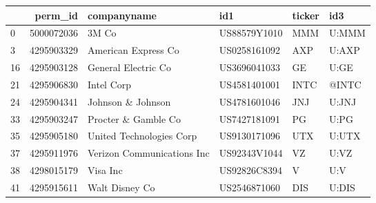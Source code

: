 \begin{tabular}{lrllll}
\toprule
{} &     perm\_id &                 companyname &           id1 & ticker &    id3 \\
\midrule
0  &  5000072036 &                       3M Co &  US88579Y1010 &    MMM &  U:MMM \\
3  &  4295903329 &         American Express Co &  US0258161092 &    AXP &  U:AXP \\
16 &  4295903128 &         General Electric Co &  US3696041033 &     GE &   U:GE \\
21 &  4295906830 &                  Intel Corp &  US4581401001 &   INTC &  @INTC \\
24 &  4295904341 &           Johnson \& Johnson &  US4781601046 &    JNJ &  U:JNJ \\
33 &  4295903247 &         Procter \& Gamble Co &  US7427181091 &     PG &   U:PG \\
35 &  4295905180 &    United Technologies Corp &  US9130171096 &    UTX &  U:UTX \\
37 &  4295911976 &  Verizon Communications Inc &  US92343V1044 &     VZ &   U:VZ \\
38 &  4298015179 &                    Visa Inc &  US92826C8394 &      V &    U:V \\
41 &  4295915611 &              Walt Disney Co &  US2546871060 &    DIS &  U:DIS \\
\bottomrule
\end{tabular}
